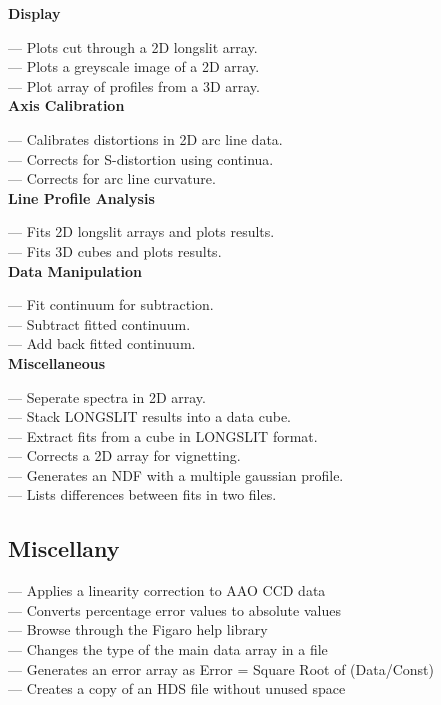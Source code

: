 {\bf Display}

 --- Plots cut through a 2D longslit array.\\
 --- Plots a greyscale image of a 2D array.\\
 --- Plot array of profiles from a 3D array.\\

{\bf Axis Calibration}

 --- Calibrates distortions in 2D arc line data.\\
 --- Corrects for S-distortion using continua.\\
 --- Corrects for arc line curvature.\\

{\bf Line Profile Analysis}

 --- Fits 2D longslit arrays and plots results.\\
 --- Fits 3D cubes and plots results.\\

{\bf Data Manipulation}

 --- Fit continuum for subtraction.\\
 --- Subtract fitted continuum.\\
 --- Add back fitted continuum.\\

{\bf Miscellaneous}

 --- Seperate spectra in 2D array.\\
 --- Stack LONGSLIT results into a data cube.\\
 --- Extract fits from a cube in LONGSLIT format.\\
 --- Corrects a 2D array for vignetting.\\
 --- Generates an NDF with a multiple gaussian profile.\\ 
 --- Lists differences between fits in two files.

\subsection{\label{classifmisc}Miscellany}

 --- Applies a linearity correction to AAO CCD data\\
 --- Converts percentage error values to absolute values\\
 --- Browse through the Figaro help library\\
 --- Changes the type of the main data array in a file\\
 --- Generates an error array as Error = Square Root of (Data/Const)\\
 --- Creates a copy of an HDS file without unused space

